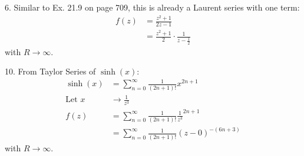 \documentclass[11pt]{homework}
\begin{document}
6. Similar to Ex. 21.9 on page 709, this is already a Laurent series with one term:
\begin{align*}
f(z) &= \frac{ z^2+1}{2z-1} \\
     &= \frac{ z^2+1}{2} \cdot \frac{1}{z-\frac{1}{2}} 
\end{align*}
with $R\rightarrow \infty$.

10. From Taylor Series of $\sinh(x)$:
\begin{align*}
\sinh(x) &= \sum_{n=0}^\infty \frac{1 }{(2n+1)!} x^{2n+1} \\
\text{Let } x &\rightarrow  \frac{1}{z^3} \\ 
f(z) &=\sum_{n=0}^\infty \frac{ 1 }{(2n+1)!} \frac{1}{z^3}^{2n+1} \\
  &= \sum_{n=0}^\infty \frac{ 1 }{(2n+1)!} (z-0)^{-(6n+3)} 
\end{align*}
with $R\rightarrow \infty$.
\end{document}
